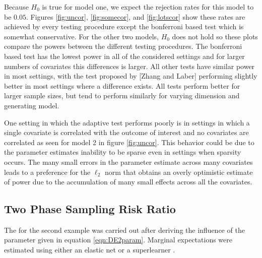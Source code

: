 \documentclass{article}
\begin{document}
Because $H_0$ is true for model one, we expect the rejection rates for this model to be $0.05$.  Figures \ref{fig:uncor}, \ref{fig:somecor}, and \ref{fig:lotscor} show these rates are achieved by every testing procedure except the bonferroni based test which is somewhat conservative.  For the other two models, $H_0$ does not hold so these plots compare the powers between the different testing procedures.  The bonferroni based test has the lowest power in all of the considered settings and for larger numbers of covariates this differences is larger. All other tests have similar power in most settings, with the test proposed by [Zhang and Laber] performing slightly better in most settings where a difference exists.  All tests perform better for larger sample sizes, but tend to perform similarly for varying dimension and generating model.

One setting in which the adaptive test performs poorly is in settings in which a single covariate is correlated with the outcome of interest and no covariates are correlated as seen for model 2 in figure \ref{fig:uncor}. This behavior could be due to the parameter estimates inability to be sparse even in settings when sparsity occurs.  The many small errors in the parameter estimate across many covariates leads to a preference for the $\ell_2$ norm that obtains an overly optimistic estimate of power due to the accumulation of many small effects across all the covariates.


\subsection*{Two Phase Sampling Risk Ratio}
The for the second example was carried out after deriving the influence of the parameter given in equation \ref{eqn:DE2param}. Marginal expectations were estimated using either an elastic net \citep{simon_blockwise_2013,tibshirani_strong_2012,friedman_regularization_2010, tibshirani_strong_2012} or a superlearner \citep{polley_super_2010}.
\end{document}
